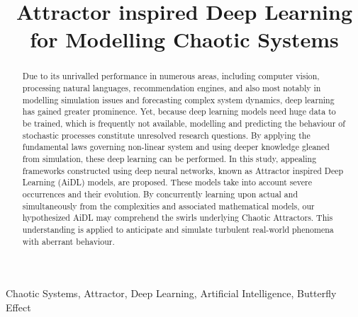 \documentclass[conference]{IEEEtran}
\begin{document}
%
\title{Attractor inspired Deep Learning for Modelling Chaotic Systems}
%
%
\author{
}

%
\maketitle              %
%
\begin{abstract}
Due to its unrivalled performance in numerous areas, including computer vision, processing natural languages, recommendation engines, and also most notably in modelling simulation issues and forecasting complex system dynamics, deep learning has gained greater prominence. Yet, because deep learning models need huge data to be trained, which is frequently not available, modelling and predicting the behaviour of stochastic processes constitute unresolved research questions. By applying the fundamental laws governing non-linear system and using deeper knowledge gleaned from simulation, these deep learning can be performed. In this study, appealing frameworks constructed using deep neural networks, known as Attractor inspired Deep Learning (AiDL) models, are proposed. These models take into account severe occurrences and their evolution. By concurrently learning upon actual and simultaneously from the complexities and associated mathematical models, our hypothesized AiDL may comprehend the swirls underlying Chaotic Attractors. This understanding is applied to anticipate and simulate turbulent real-world phenomena with aberrant behaviour. \\
\end{abstract}

\begin{IEEEkeywords}
Chaotic Systems, Attractor, Deep Learning, Artificial Intelligence, Butterfly Effect
\end{IEEEkeywords}
%
%
%
\end{document}
